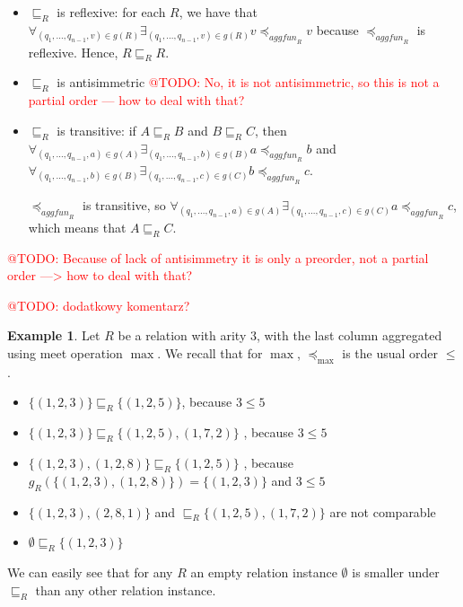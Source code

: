 \documentclass{pracamgr}
\makeatletter
\theoremstyle{plain}
\theoremstyle{definition}
\newtheorem{exmp}{Example}[section]
\theoremstyle{remark}
\newcommand{\todo}[1]{\textcolor{red}{@TODO: #1}}
\newcommand{\aggfun}{\textit{aggfun} }
\makeatother
\begin{document}
\begin{itemize}
\item $\sqsubseteq_R$ is reflexive: for each $R$, we have that  $\forall_{(q_1, ..., q_{n-1}, v) \in g(R)} \exists_{(q_1, ..., q_{n-1}, v) \in g(R)} v \preceq_{\aggfun_R} v $ because $\preceq_{\aggfun_R}$ is reflexive. Hence, $R \sqsubseteq_R R$.
\item $\sqsubseteq_R$ is antisimmetric \todo{No, it is not antisimmetric, so this is not a partial order --- how to deal with that?}
\item $\sqsubseteq_R$ is transitive: if $A \sqsubseteq_R B$ and $B \sqsubseteq_R  C$, then $\forall_{(q_1, ..., q_{n-1}, a) \in g(A)} \exists_{(q_1, ..., q_{n-1}, b) \in g(B)} a \preceq_{\aggfun_R} b $ and $\forall_{(q_1, ..., q_{n-1}, b) \in g(B)} \exists_{(q_1, ..., q_{n-1}, c) \in g(C)} b \preceq_{\aggfun_R} c$.

$\preceq_{\aggfun_R}$ is transitive, so $\forall_{(q_1, ..., q_{n-1}, a) \in g(A)} \exists_{(q_1, ..., q_{n-1}, c) \in g(C)} a \preceq_{\aggfun_R} c $, which means that $A \sqsubseteq_R C$.
\end{itemize}

\todo{Because of lack of antisimmetry it is only a preorder, not a partial order ---> how to deal with that?}

\todo{dodatkowy komentarz?}

\begin{exmp}
Let $R$ be a relation with arity $3$, with the last column aggregated using meet operation $\max$.
We recall that for $ \max $, $ \preceq_{\max} $ is the usual order $ \le $.
\begin{itemize}
\item $\{(1, 2, 3)\} \sqsubseteq_R \{(1, 2, 5)\}$, because $3 \le 5$
\item $\{(1, 2, 3)\} \sqsubseteq_R \{(1, 2, 5), (1, 7, 2)\}$ , because $3 \le 5$
\item $\{(1, 2, 3), (1, 2, 8)\} \sqsubseteq_R \{(1, 2, 5)\}$ , because $g_R(\{(1, 2, 3), (1, 2, 8)\}) = \{(1,2,3)\}$ and $3 \le 5$
\item $\{(1, 2, 3), (2, 8, 1)\}$ and  $\sqsubseteq_R \{(1, 2, 5), (1, 7, 2)\}$ are not comparable
\item $\emptyset \sqsubseteq_R \{(1, 2, 3)\}$
\end{itemize}
\end{exmp}

We can easily see that for any $R$ an empty relation instance $\emptyset$ is smaller under $\sqsubseteq_R$  than any other relation instance.
\end{document}
